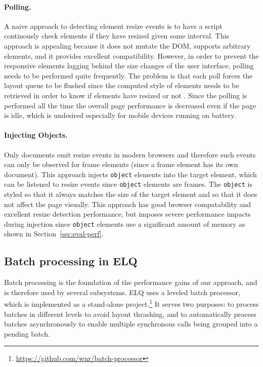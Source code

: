 \documentclass{llncs}
\newcommand{\code}[1]{\texttt{#1}}
\newcommand{\elq}{ELQ}
\begin{document}
    \paragraph{Polling.}
    A naive approach to detecting element resize events is to have a script continously check elements if they have resized given some interval.
    This approach is appealing because it does not mutate the DOM, supports arbitrary elements, and it provides excellent compatibility.
    However, in order to prevent the responsive elements lagging behind the size changes of the user interface, polling needs to be performed quite frequently.
    The problem is that each poll forces the layout queue to be flushed since the computed style of elements needs to be retrieved in order to know if elements have resized or not \cite{elq-thesis}.
    Since the polling is performed all the time the overall page performance is decreased even if the page is idle, which is undesired especially for mobile devices running on battery.

    \paragraph{Injecting Objects.}
    Only documents emit resize events in modern browsers and therefore such events can only be observed for frame elements (since a frame element has its own document).
    This approach injects \code{object} elements into the target element, which can be listened to resize events since \code{object} elements are frames.
    The \code{object} is styled so that it always matches the size of the target element and so that it does not affect the page visually.
    This approach has good browser compatability and excellent resize detection performance, but imposes severe performance impacts during injection since \code{object} elements use a significant amount of memory as shown in Section~\ref{sec:eval-perf}.

  \subsection{Batch processing in ELQ}\label{sec:imp_batch_processor}
    Batch processing is the foundation of the performance gains of our approach, and is therefore used by several subsystems.
    \elq{} uses a leveled batch processor, which is implemented as a stand-alone project.\footnote{\url{https://github.com/wnr/batch-processor}}
    It serves two purposes: to process batches in different levels to avoid layout thrashing, and to automatically process batches asynchronously to enable multiple synchronous calls being grouped into a pending batch.
\end{document}
